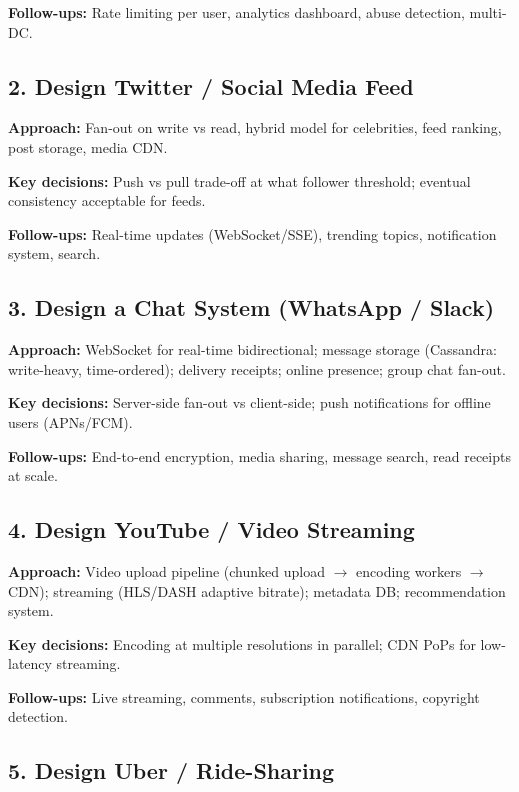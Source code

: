 \documentclass[11pt]{article}
\begin{document}
\textbf{Follow-ups:} Rate limiting per user, analytics dashboard, abuse detection, multi-DC.

\subsection{2. Design Twitter / Social Media Feed}\label{2-design-twitter--social-media-feed}

\textbf{Approach:} Fan-out on write vs read, hybrid model for celebrities, feed ranking, post storage, media CDN.

\textbf{Key decisions:} Push vs pull trade-off at what follower threshold; eventual consistency acceptable for feeds.

\textbf{Follow-ups:} Real-time updates (WebSocket/SSE), trending topics, notification system, search.

\subsection{3. Design a Chat System (WhatsApp / Slack)}\label{3-design-a-chat-system-whatsapp--slack}

\textbf{Approach:} WebSocket for real-time bidirectional; message storage (Cassandra: write-heavy, time-ordered); delivery receipts; online presence; group chat fan-out.

\textbf{Key decisions:} Server-side fan-out vs client-side; push notifications for offline users (APNs/FCM).

\textbf{Follow-ups:} End-to-end encryption, media sharing, message search, read receipts at scale.

\subsection{4. Design YouTube / Video Streaming}\label{4-design-youtube--video-streaming}

\textbf{Approach:} Video upload pipeline (chunked upload \(\rightarrow\) encoding workers \(\rightarrow\) CDN); streaming (HLS/DASH adaptive bitrate); metadata DB; recommendation system.

\textbf{Key decisions:} Encoding at multiple resolutions in parallel; CDN PoPs for low-latency streaming.

\textbf{Follow-ups:} Live streaming, comments, subscription notifications, copyright detection.

\subsection{5. Design Uber / Ride-Sharing}\label{5-design-uber--ride-sharing}
\end{document}
